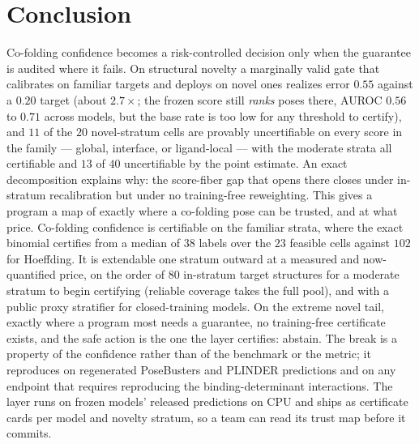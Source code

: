 \documentclass[10pt]{article}
\begin{document}
\section{Conclusion}
Co-folding confidence becomes a risk-controlled decision only when the guarantee is audited where it fails.
On structural novelty a marginally valid gate that calibrates on familiar targets and deploys on novel ones
realizes error $0.55$ against a $0.20$ target (about $2.7\times$; the frozen score still \emph{ranks} poses
there, AUROC $0.56$ to $0.71$ across models, but the base rate is too low for any threshold to certify), and $11$ of the $20$
novel-stratum cells are provably uncertifiable on every score in the family --- global, interface, or
ligand-local --- with the moderate strata all certifiable and $13$ of $40$ uncertifiable by the point estimate. An exact decomposition explains why: the score-fiber gap that opens
there closes under in-stratum recalibration but under no training-free reweighting. This gives a program a
map of exactly where a co-folding pose can be trusted, and at what price. Co-folding confidence is
certifiable on the familiar strata, where the exact binomial certifies from a median of $38$ labels over
the $23$ feasible cells against $102$ for Hoeffding. It is extendable one stratum outward at a measured and
now-quantified price, on the order of $80$ in-stratum target structures for a moderate stratum to begin
certifying (reliable coverage takes the full pool), and with a public proxy stratifier for closed-training
models. On the extreme novel tail, exactly where a
program most needs a guarantee, no training-free certificate exists, and the safe action is the one
the layer certifies: abstain. The break is a property of the confidence rather than of the benchmark or the
metric; it reproduces on regenerated PoseBusters and PLINDER predictions and on any endpoint that requires
reproducing the binding-determinant interactions. The layer runs on frozen models' released predictions on
CPU and ships as certificate cards per model and novelty stratum, so a team can read its trust map before
it commits.
\end{document}
